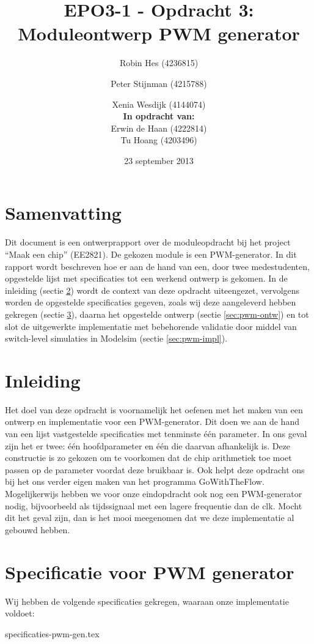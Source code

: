 \documentclass{article}
\author{
Robin Hes (4236815) \and Peter Stijnman (4215788) \and Xenia Wesdijk (4144074) \\

\textbf{In opdracht van:} \\
Erwin de Haan (4222814) \\
Tu Hoang (4203496) \\
}
\title{EPO3-1 - Opdracht 3: Moduleontwerp PWM generator}
\date{23 september 2013}
\begin{document}
\maketitle
\section{Samenvatting}
Dit document is een ontwerprapport over de moduleopdracht bij het project ``Maak een chip'' (EE2821). De gekozen module is een PWM-generator.
In dit rapport wordt beschreven hoe er aan de hand van een, door twee medestudenten, opgestelde lijst met specificaties tot een werkend ontwerp is gekomen.
In de inleiding (sectie \ref{sec:pwm-inl}) wordt de context van deze opdracht uiteengezet, vervolgens worden de opgestelde specificaties gegeven, zoals wij deze aangeleverd hebben gekregen (sectie \ref{sec:pwm-spec}), daarna het opgestelde ontwerp (sectie \ref{sec:pwm-ontw}) en tot slot de uitgewerkte implementatie met bebehorende validatie door middel van switch-level simulaties in Modelsim (sectie \ref{sec:pwm-impl}).

\tableofcontents

\section{Inleiding}
\label{sec:pwm-inl}
Het doel van deze opdracht is voornamelijk het oefenen met het maken van een ontwerp en implementatie voor een PWM-generator. Dit doen we aan de hand van een lijst vastgestelde specificaties met tenminste één parameter. In ons geval zijn het er twee: één hoofdparameter en één die daarvan afhankelijk is. Deze constructie is zo gekozen om te voorkomen dat de chip arithmetiek toe moet passen op de parameter voordat deze bruikbaar is. Ook helpt deze opdracht ons bij het ons verder eigen maken van het programma GoWithTheFlow.
Mogelijkerwijs hebben we voor onze eindopdracht ook nog een PWM-generator nodig, bijvoorbeeld als tijdssignaal met een lagere frequentie dan de clk. Mocht dit het geval zijn, dan is het mooi meegenomen dat we deze implementatie al gebouwd hebben.

\section{Specificatie voor PWM generator}
\label{sec:pwm-spec}
Wij hebben de volgende specificaties gekregen, waaraan onze implementatie voldoet:

{specificaties-pwm-gen.tex}
\end{document}
